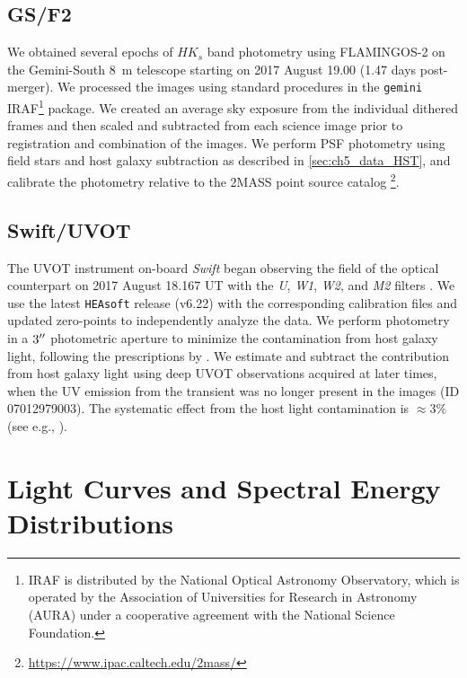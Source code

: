 \subsection{GS/F2}
\label{sec:ch5_data_GSF2}
We obtained several epochs of $HK_s$ band photometry using FLAMINGOS-2 on the Gemini-South 8~m telescope \citep{Eikenberry+12} starting on 2017 August 19.00 (1.47 days post-merger). We processed the images using standard procedures in the {\tt gemini} IRAF\footnote{IRAF is distributed by the National Optical Astronomy Observatory, which is operated by the Association of Universities for Research in Astronomy (AURA) under a cooperative agreement with the National Science Foundation.} package.  We created an average sky exposure from the individual dithered frames and then scaled and subtracted from each science image prior to registration and combination of the images. We perform PSF photometry using field stars and host galaxy subtraction as described in \cref{sec:ch5_data_HST}, and calibrate the photometry relative to the 2MASS point source catalog \footnote{\url{https://www.ipac.caltech.edu/2mass/}}.

\subsection{Swift/UVOT}
\label{sec:ch5_data_UVOT}
The UVOT instrument on-board {\it Swift} \citep{Gehrels+04, Roming+05} began observing the field of the optical counterpart on 2017 August 18.167 UT with the {\it U}, {\it W1}, {\it W2}, and {\it M2} filters \citep{Evans+17}.  We use the latest {\tt HEAsoft} release (v6.22) with the corresponding calibration files and updated zero-points to independently analyze the data. We perform photometry in a $3\hbox{$^{\prime\prime}$}$ photometric aperture to minimize the contamination from host galaxy light, following the prescriptions by \citet{Brown+09}. We estimate and subtract the contribution from host galaxy light using deep UVOT observations acquired at later times, when the UV emission from the transient was no longer present in the images (\swift ID 07012979003). The systematic effect from the host light contamination is $\approx 3\%$ (see e.g., \citealt{Brown+09}).

\section{Light Curves and Spectral Energy Distributions}
\label{sec:ch5_analysis}

